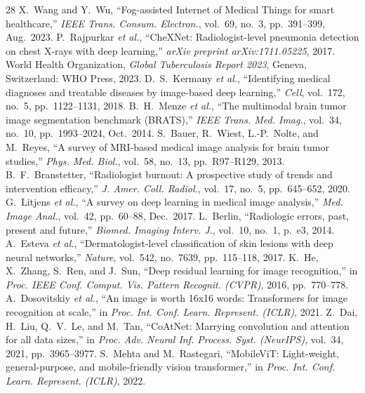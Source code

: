 \documentclass[journal]{IEEEtran}
\begin{document}
\begin{thebibliography}{28}
 X.~Wang and Y.~Wu, ``Fog-assisted Internet of Medical Things for smart healthcare,'' \emph{IEEE Trans. Consum. Electron.}, vol.~69, no.~3, pp.~391--399, Aug.~2023.
 P.~Rajpurkar \textit{et al.}, ``CheXNet: Radiologist-level pneumonia detection on chest X-rays with deep learning,'' \emph{arXiv preprint arXiv:1711.05225}, 2017.
 World Health Organization, \emph{Global Tuberculosis Report 2023}, Geneva, Switzerland: WHO Press, 2023.
 D.~S.~Kermany \textit{et al.}, ``Identifying medical diagnoses and treatable diseases by image-based deep learning,'' \emph{Cell}, vol.~172, no.~5, pp.~1122--1131, 2018.
 B.~H.~Menze \textit{et al.}, ``The multimodal brain tumor image segmentation benchmark (BRATS),'' \emph{IEEE Trans. Med. Imag.}, vol.~34, no.~10, pp.~1993--2024, Oct.~2014.
 S.~Bauer, R.~Wiest, L.-P.~Nolte, and M.~Reyes, ``A survey of MRI-based medical image analysis for brain tumor studies,'' \emph{Phys. Med. Biol.}, vol.~58, no.~13, pp.~R97--R129, 2013.
 B.~F.~Branstetter, ``Radiologist burnout: A prospective study of trends and intervention efficacy,'' \emph{J. Amer. Coll. Radiol.}, vol.~17, no.~5, pp.~645--652, 2020.
 G.~Litjens \textit{et al.}, ``A survey on deep learning in medical image analysis,'' \emph{Med. Image Anal.}, vol.~42, pp.~60--88, Dec.~2017.
 L.~Berlin, ``Radiologic errors, past, present and future,'' \emph{Biomed. Imaging Interv. J.}, vol.~10, no.~1, p.~e3, 2014.
 A.~Esteva \textit{et al.}, ``Dermatologist-level classification of skin lesions with deep neural networks,'' \emph{Nature}, vol.~542, no.~7639, pp.~115--118, 2017.
 K.~He, X.~Zhang, S.~Ren, and J.~Sun, ``Deep residual learning for image recognition,'' in \emph{Proc. IEEE Conf. Comput. Vis. Pattern Recognit. (CVPR)}, 2016, pp.~770--778.
 A.~Dosovitskiy \textit{et al.}, ``An image is worth 16x16 words: Transformers for image recognition at scale,'' in \emph{Proc. Int. Conf. Learn. Represent. (ICLR)}, 2021.
 Z.~Dai, H.~Liu, Q.~V.~Le, and M.~Tan, ``CoAtNet: Marrying convolution and attention for all data sizes,'' in \emph{Proc. Adv. Neural Inf. Process. Syst. (NeurIPS)}, vol.~34, 2021, pp.~3965--3977.
 S.~Mehta and M.~Rastegari, ``MobileViT: Light-weight, general-purpose, and mobile-friendly vision transformer,'' in \emph{Proc. Int. Conf. Learn. Represent. (ICLR)}, 2022.

\end{thebibliography}
\end{document}
